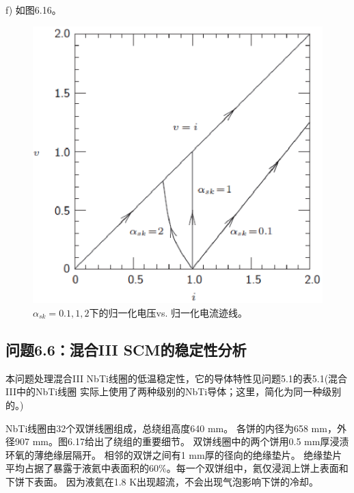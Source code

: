 f) 如图6.16。
\begin{figure}[htbp]
	\centering
	\includegraphics[scale=0.7]{chpt6/figs/fig6.16.eps}
	\caption{$\alpha_{sk}=0.1,1,2$下的归一化电压vs. 归一化电流迹线。}
\end{figure}


\subsection{问题6.6：混合III SCM的稳定性分析}
本问题处理混合III NbTi线圈的低温稳定性，它的导体特性见问题5.1的表5.1(混合III中的NbTi线圈
实际上使用了两种级别的NbTi导体；这里，简化为同一种级别的。)

NbTi线圈由32个双饼线圈组成，总绕组高度640 mm。
各饼的内径为658 mm，外径907 mm。图6.17给出了绕组的重要细节。
双饼线圈中的两个饼用0.5 mm厚浸渍环氧的薄绝缘层隔开。
相邻的双饼之间有1 mm厚的径向的绝缘垫片。
绝缘垫片平均占据了暴露于液氦中表面积的60\%。每一个双饼组中，氦仅浸润上饼上表面和下饼下表面。
因为液氦在1.8 K出现超流，不会出现气泡影响下饼的冷却。

